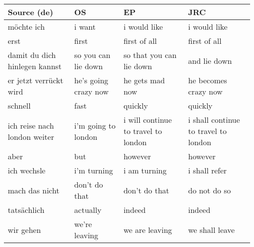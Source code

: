 \documentclass[11pt,a4paper]{article}
\begin{document}
\begin{table*}[]
\centering
\begin{tabular}{|p{3.5cm}|p{3.5cm}|p{3.5cm}|p{3.5cm}|}
\hline
\textbf{Source (de)}                             & \textbf{OS}                                & \textbf{EP}                                          & \textbf{JRC}                                   \\ \hline
m{\"o}chte ich                              & i want                            & i would like                                & i would like                          \\ \hline
erst                                    & first                             & first of all                                & first of all                          \\ \hline
damit du dich hinlegen kannst           & so you can lie down               & so that you can lie down                    & and lie down                          \\ \hline
er jetzt verr{\"u}ckt wird                  & he's going crazy now              & he gets mad now                             & he becomes crazy now                  \\ \hline
schnell                                 & fast                              & quickly                                     & quickly                               \\ \hline
ich reise nach london weiter            & i'm going to london               & i will continue to travel to london         & i shall continue to travel to london  \\ \hline
aber                                    & but                               & however                                     & however                               \\ \hline
ich wechsle                             & i'm turning                       & i am turning                                & i shall refer                         \\ \hline
mach das nicht                          & don't do that                     & don't do that                               & do not do so                          \\ \hline
tats{\"a}chlich                             & actually                          & indeed                                      & indeed                                \\ \hline
wir gehen                               & we're leaving                     & we are leaving                              & we shall leave                        \\ \hline

\end{tabular}
\end{table*}
\end{document}
